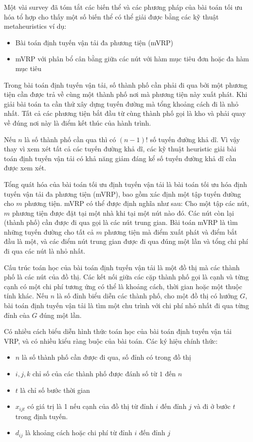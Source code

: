 \documentclass[14pt, a4paper]{article}
\numberwithin{equation}{section}
\numberwithin{figure}{section}
\numberwithin{dl}{section}
\numberwithin{md}{section}
\numberwithin{bd}{section}
\numberwithin{dn}{section}
\numberwithin{hq}{section}
\begin{document}
    Một vài survey đã tóm tắt các biến thể và các phương pháp của bài toán tối ưu hóa tổ hợp cho thấy một số biến thể có thể giải được bằng các kỹ thuật metaheuristics ví dụ:

    \begin{itemize}
        \item Bài toán định tuyến vận tải đa phương tiện (mVRP)
        \item mVRP với phân bổ cân bằng giữa các nút với hàm mục tiêu đơn hoặc đa hàm mục tiêu
    \end{itemize}

    Trong bài toán định tuyến vận tải, số thành phố cần phải đi qua bởi một phương tiện cần được trả về cùng một thành phố nơi mà phương tiện này xuất phát.
    Khi giải bài toán ta cần thử xây dựng tuyến đường mà tổng khoảng cách đi là nhỏ nhất.
    Tất cả các phương tiện bắt đầu từ cùng thành phố gọi là kho và phải quay về đúng nơi này là điểm kết thúc của hành trình.

    Nếu $n$ là số thành phố cần qua thì có $(n-1)!$ số tuyến đường khả dĩ.
    Vì vậy thay vì xem xét tất cả các tuyến đường khả dĩ, các kỹ thuật heuristic giải bài toán định tuyến vận tải có khả năng giảm đáng kể số tuyến đường khả dĩ cần được xem xét.

    Tổng quát hóa của bài toán tối ưu định tuyến vận tải là bài toán tối ưu hóa định tuyến vận tải đa phương tiện (mVRP), bao gồm xác định một tập tuyến đường cho $m$ phương tiện.
    mVRP có thể được định nghĩa như sau: Cho một tập các nút, $m$ phương tiện được đặt tại một nhà khi tại một nút nào đó. Các nút còn lại (thành phố) cần được đi qua gọi là các nút trung gian.
    Bài toán mVRP là tìm những tuyến đường cho tất cả $m$ phương tiện mà điểm xuất phát và điểm bắt đầu là một, và các điểm nút trung gian được đi qua đúng một lần và tổng chi phí đi qua các nút là nhỏ nhất.

    Cấu trúc toán học của bài toán định tuyến vận tải là một đồ thị mà các thành phố là các nút của đồ thị.
    Các kết nối giữa các cặp thành phố gọi là cạnh và từng cạnh có một chi phí tương ứng có thể là khoảng cách, thời gian hoặc một thuộc tính khác.
    Nếu $n$ là số đỉnh biểu diễn các thành phố, cho một đồ thị có hướng $G$,
    bài toán định tuyến vận tải là tìm một chu trình với chi phí nhỏ nhất đi qua từng đỉnh của $G$ đúng một lần.

    Có nhiều cách biểu diễn hình thức toán học của bài toán định tuyến vận tải VRP, và có nhiều kiểu ràng buộc của bài toán.
    Các ký hiệu chính thức:
    \begin{itemize}
        \item $n$ là số thành phố cần được đi qua, số đỉnh có trong đồ thị
        \item $i, j, k$ chỉ số của các thành phố được đánh số từ $1$ đến $n$
        \item $t$ là chỉ số bước thời gian
        \item $x_{ijt}$ có giá trị là 1 nếu cạnh của đồ thị từ đỉnh $i$ đến đỉnh $j$ và đi ở bước $t$ trong định tuyến.
        \item $d_{ij}$ là khoảng cách hoặc chi phí từ đỉnh $i$ đến đỉnh $j$
    \end{itemize}
\end{document}
